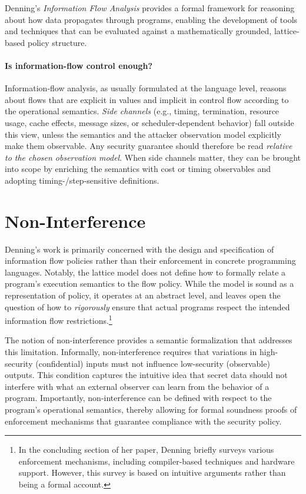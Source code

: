 \documentclass[12pt,a4paper,twoside]{book}
\begin{document}
Denning's \textit{Information Flow Analysis} provides a formal framework for reasoning about how data propagates through programs, enabling the development of tools and techniques that can be evaluated against a mathematically grounded, lattice-based policy structure.

\paragraph{Is information-flow control enough?}
Information-flow analysis, as usually formulated at the language level, reasons
about flows that are explicit in values and implicit in control flow according to
the operational semantics\cite{sabelfeld2003language}.
\emph{Side channels} (e.g., timing, termination,
resource usage, cache effects, message sizes, or scheduler-dependent behavior)\cite{kelsey1998side}
fall outside this view, unless the semantics and the attacker observation model
explicitly make them observable.
Any security guarantee should therefore be read
\emph{relative to the chosen observation model}.
When side channels matter, they can be brought into scope by enriching the semantics with cost or timing
observables and adopting timing-/step-sensitive definitions\cite{197207}.

\section{Non-Interference}
Denning's work\cite{denning1976lattice} is primarily concerned with the design and specification of information flow policies rather than their enforcement in concrete programming languages. Notably, the lattice model does not define how to formally relate a program's execution semantics to the flow policy. While the model is sound as a representation of policy, it operates at an abstract level, and leaves open the question of how to \textit{rigorously} ensure that actual programs respect the intended information flow restrictions.\footnote{In the concluding section of her paper, Denning briefly surveys various enforcement mechanisms, including compiler-based techniques and hardware support. However, this survey is based on intuitive arguments rather than being a formal account.}

The notion of non-interference\cite{goguen1982security} provides a semantic formalization that addresses this limitation. Informally, non-interference requires that variations in high-security (confidential) inputs must not influence low-security (observable) outputs\cite{volpano1996sound}. This condition captures the intuitive idea that secret data should not interfere with what an external observer can learn from the behavior of a program. Importantly, non-interference can be defined with respect to the program's operational semantics, thereby allowing for formal soundness proofs of enforcement mechanisms that guarantee compliance with the security policy\cite{volpano1996sound}.
\end{document}
